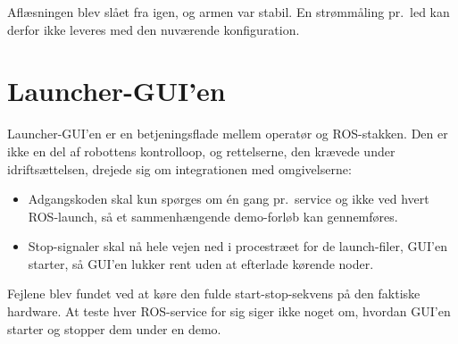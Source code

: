 Aflæsningen blev slået fra igen, og armen var stabil. En strømmåling
pr.~led kan derfor ikke leveres med den nuværende konfiguration.

\clearpage
\section{Launcher-GUI'en}

Launcher-GUI'en er en betjeningsflade mellem operatør og
ROS-stakken. Den er ikke en del af robottens kontrolloop, og
rettelserne, den krævede under idriftsættelsen, drejede sig om
integrationen med omgivelserne:

\begin{itemize}
    \item Adgangskoden skal kun spørges om én gang pr.~service og
          ikke ved hvert ROS-launch, så et sammenhængende
          demo-forløb kan gennemføres.
    \item Stop-signaler skal nå hele vejen ned i procestræet for de
          launch-filer, GUI'en starter, så GUI'en lukker rent uden
          at efterlade kørende noder.
\end{itemize}

Fejlene blev fundet ved at køre den fulde start-stop-sekvens på den
faktiske hardware. At teste hver ROS-service for sig siger ikke
noget om, hvordan GUI'en starter og stopper dem under en demo.

